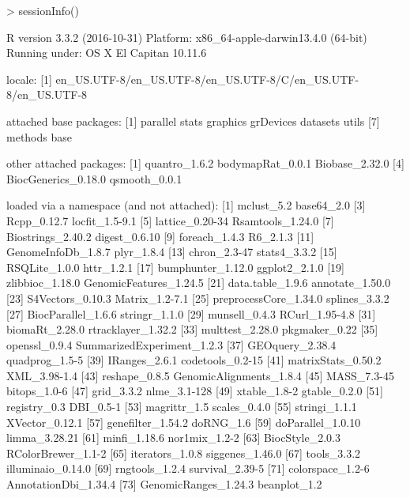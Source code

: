 \documentclass{article}
\begin{document}
\begin{Schunk}
\begin{Sinput}
> sessionInfo()
\end{Sinput}
\begin{Soutput}
R version 3.3.2 (2016-10-31)
Platform: x86_64-apple-darwin13.4.0 (64-bit)
Running under: OS X El Capitan 10.11.6

locale:
[1] en_US.UTF-8/en_US.UTF-8/en_US.UTF-8/C/en_US.UTF-8/en_US.UTF-8

attached base packages:
[1] parallel  stats     graphics  grDevices datasets  utils    
[7] methods   base     

other attached packages:
[1] quantro_1.6.2       bodymapRat_0.0.1    Biobase_2.32.0     
[4] BiocGenerics_0.18.0 qsmooth_0.0.1      

loaded via a namespace (and not attached):
 [1] mclust_5.2                 base64_2.0                
 [3] Rcpp_0.12.7                locfit_1.5-9.1            
 [5] lattice_0.20-34            Rsamtools_1.24.0          
 [7] Biostrings_2.40.2          digest_0.6.10             
 [9] foreach_1.4.3              R6_2.1.3                  
[11] GenomeInfoDb_1.8.7         plyr_1.8.4                
[13] chron_2.3-47               stats4_3.3.2              
[15] RSQLite_1.0.0              httr_1.2.1                
[17] bumphunter_1.12.0          ggplot2_2.1.0             
[19] zlibbioc_1.18.0            GenomicFeatures_1.24.5    
[21] data.table_1.9.6           annotate_1.50.0           
[23] S4Vectors_0.10.3           Matrix_1.2-7.1            
[25] preprocessCore_1.34.0      splines_3.3.2             
[27] BiocParallel_1.6.6         stringr_1.1.0             
[29] munsell_0.4.3              RCurl_1.95-4.8            
[31] biomaRt_2.28.0             rtracklayer_1.32.2        
[33] multtest_2.28.0            pkgmaker_0.22             
[35] openssl_0.9.4              SummarizedExperiment_1.2.3
[37] GEOquery_2.38.4            quadprog_1.5-5            
[39] IRanges_2.6.1              codetools_0.2-15          
[41] matrixStats_0.50.2         XML_3.98-1.4              
[43] reshape_0.8.5              GenomicAlignments_1.8.4   
[45] MASS_7.3-45                bitops_1.0-6              
[47] grid_3.3.2                 nlme_3.1-128              
[49] xtable_1.8-2               gtable_0.2.0              
[51] registry_0.3               DBI_0.5-1                 
[53] magrittr_1.5               scales_0.4.0              
[55] stringi_1.1.1              XVector_0.12.1            
[57] genefilter_1.54.2          doRNG_1.6                 
[59] doParallel_1.0.10          limma_3.28.21             
[61] minfi_1.18.6               nor1mix_1.2-2             
[63] BiocStyle_2.0.3            RColorBrewer_1.1-2        
[65] iterators_1.0.8            siggenes_1.46.0           
[67] tools_3.3.2                illuminaio_0.14.0         
[69] rngtools_1.2.4             survival_2.39-5           
[71] colorspace_1.2-6           AnnotationDbi_1.34.4      
[73] GenomicRanges_1.24.3       beanplot_1.2              
\end{Soutput}
\end{Schunk}


\end{document}
